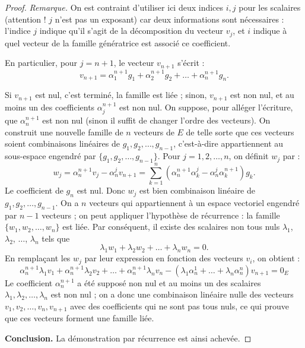 \documentclass[class=report,crop=false]{standalone}
\begin{document}
\begin{proof}
\emph{Remarque.} On est contraint d'utiliser ici deux indices $i, j$ pour les scalaires
(attention ! $j$ n'est pas un exposant) car deux informations sont nécessaires :
l'indice $j$ indique qu'il s'agit de la décomposition du vecteur $v_j$,
et $i$ indique à quel vecteur de la famille génératrice  est associé ce coefficient.

\medskip

En particulier, pour $j=n+1$, le vecteur  $v_{n+1}$ s'écrit :
$$v_{n+1}=\alpha_1^{n+1}g_1+\alpha_2^{n+1}g_2+ \dots + \alpha_n^{n+1}g_n.$$

Si  $v_{n+1}$ est nul, c'est terminé, la famille est liée ; sinon,
$v_{n+1}$ est non nul, et au moins un des coefficients  $\alpha_j^{n+1}$ est non nul.
On suppose, pour alléger l'écriture, que  $\alpha_n^{n+1}$ est non nul
(sinon il suffit de changer l'ordre des vecteurs).
On construit une nouvelle famille de $n$ vecteurs de $E$ de
telle sorte que ces vecteurs soient combinaisons linéaires de $g_1,g_2, \ldots ,g_{n-1}$,
c'est-à-dire appartiennent au sous-espace engendré par $\{g_1,g_2, \dots ,g_{n-1}\}$.
Pour $j=1,2, \ldots, n$, on définit $w_j$ par :
  $$w_j=\alpha_n^{n+1}v_j-\alpha_n^jv_{n+1}=
\sum_{k=1}^n(\alpha _n^{n+1}\alpha_{k}^j-\alpha_n^j\alpha_{k}^{n+1} )g_{k}.$$
Le coefficient de $g_n$ est nul. Donc $w_j$ est bien combinaison linéaire de
$g_1,g_2, \dots ,g_{n-1}$.
On a $n$ vecteurs qui appartiennent à un espace vectoriel engendré par
$n-1$ vecteurs ; on peut appliquer l'hypothèse de récurrence : la  famille
$\{w_1, w_2, \dots ,w_n\}$ est liée.
Par conséquent, il existe des scalaires non tous nuls $\lambda_1$, $\lambda_2$,
$\ldots$, $\lambda_n$ tels que
  $$\lambda_1w_1+\lambda_2w_2+\dots + \lambda_nw_n=0.$$
En remplaçant les $w_j$ par leur expression en fonction des vecteurs $v_i$,
on obtient :
  $$\alpha_n^{n+1}\lambda_1v_1+\alpha_n^{n+1}\lambda_2v_2+ \dots +
  \alpha_n^{n+1}\lambda_nv_n-
  (\lambda_1\alpha_n^1+ \dots + \lambda_n\alpha_n^n)v_{n+1}=0_{E}$$
Le coefficient $\alpha_n^{n+1}$ a été supposé non nul et au moins un des scalaires
$\lambda_1, \lambda_2, \ldots ,\lambda_n$
 est non nul ; on a donc une combinaison linéaire nulle des vecteurs
 $v_1,v_2,\dots,v_n,v_{n+1}$
 avec des coefficients qui ne sont pas tous nuls, ce qui prouve que ces vecteurs
 forment une famille liée.

\bigskip

\textbf{Conclusion.} La démonstration par récurrence est ainsi achevée.
\end{proof}
\end{document}
